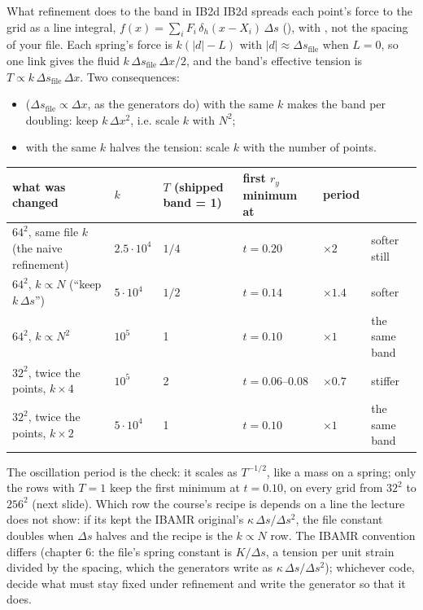 \documentclass[aspectratio=169,11pt]{beamer}
\begin{document}
\begin{frame}{What refinement does to the band in IB2d}
\label{fr:kscaling}
\footnotesize
IB2d spreads each point's force to the grid as a line integral, $f(x) = \sum_i F_i\, \delta_h(x - X_i)\, \Delta s$ (), with , not the spacing of your file. Each spring's force is $k(|d| - L)$ with $|d| \approx \Delta s_{\text{file}}$ when $L = 0$, so one link gives the fluid $k\,\Delta s_{\text{file}}\,\Delta x/2$, and the band's effective tension is $T \propto k\,\Delta s_{\text{file}}\,\Delta x$. Two consequences:
\begin{itemize}
  \item {} ($\Delta s_{\text{file}} \propto \Delta x$, as the generators do) with the same $k$ makes the band  per doubling: keep $k\,\Delta x^2$, i.e. scale $k$ with $N^2$;
  \item {} with the same $k$ halves the tension: scale $k$ with the number of points.
\end{itemize}
\vspace{-2mm}
\begin{center}
\tiny
\begin{tabular}{@{}llllll@{}}
\toprule
what was changed & $k$ & $T$ (shipped band = 1) & first $r_y$ minimum at & period & \\
\midrule
$64^2$, same file $k$ (the naive refinement) & $2.5 \cdot 10^4$ & $1/4$ & $t = 0.20$ & $\times 2$ & softer still \\
$64^2$, $k \propto N$ (``keep $k\,\Delta s$'') & $5 \cdot 10^4$ & $1/2$ & $t = 0.14$ & $\times 1.4$ & softer \\
$64^2$, $k \propto N^2$ & $10^5$ & 1 & $t = 0.10$ & $\times 1$ & the same band \\
$32^2$, twice the points, $k \times 4$ & $10^5$ & 2 & $t = 0.06$--$0.08$ & $\times 0.7$ & stiffer \\
$32^2$, twice the points, $k \times 2$ & $5 \cdot 10^4$ & 1 & $t = 0.10$ & $\times 1$ & the same band \\
\bottomrule
\end{tabular}
\end{center}
The oscillation period is the check: it scales as $T^{-1/2}$, like a mass on a spring; only the rows with $T = 1$ keep the first minimum at $t = 0.10$, on every grid from $32^2$ to $256^2$ (next slide). Which row the course's recipe is depends on a line the lecture does not show: if its  kept the IBAMR original's $\kappa\,\Delta s/\Delta s^2$, the file constant doubles when $\Delta s$ halves and the recipe is the $k \propto N$ row. The IBAMR convention differs (chapter 6: the file's spring constant is $K/\Delta s$, a tension per unit strain divided by the spacing, which the generators write as $\kappa\,\Delta s/\Delta s^2$); whichever code, decide what must stay fixed under refinement and write the generator so that it does.
\end{frame}
\end{document}
